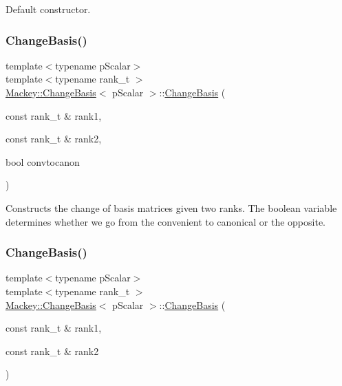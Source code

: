 Default constructor. 

\mbox{\label{classMackey_1_1ChangeBasis_a39b9a8d75509c70e728342172a321924}} 
\subsubsection{\texorpdfstring{Change\+Basis()}{ChangeBasis()}\hspace{0.1cm}{\footnotesize\ttfamily [2/3]}}
{\footnotesize\ttfamily template$<$typename p\+Scalar$>$ \\
template$<$typename rank\+\_\+t $>$ \\
\hyperlink{classMackey_1_1ChangeBasis}{Mackey\+::\+Change\+Basis}$<$ p\+Scalar $>$\+::\hyperlink{classMackey_1_1ChangeBasis}{Change\+Basis} (\begin{DoxyParamCaption}\item[{const rank\+\_\+t \&}]{rank1,  }\item[{const rank\+\_\+t \&}]{rank2,  }\item[{bool}]{convtocanon }\end{DoxyParamCaption})\hspace{0.3cm}{\ttfamily [inline]}}



Constructs the change of basis matrices given two ranks. The boolean variable determines whether we go from the convenient to canonical or the opposite. 

\mbox{\label{classMackey_1_1ChangeBasis_a8cc49fe5537e7038ff7d142ba76e7c7b}} 
\subsubsection{\texorpdfstring{Change\+Basis()}{ChangeBasis()}\hspace{0.1cm}{\footnotesize\ttfamily [3/3]}}
{\footnotesize\ttfamily template$<$typename p\+Scalar$>$ \\
template$<$typename rank\+\_\+t $>$ \\
\hyperlink{classMackey_1_1ChangeBasis}{Mackey\+::\+Change\+Basis}$<$ p\+Scalar $>$\+::\hyperlink{classMackey_1_1ChangeBasis}{Change\+Basis} (\begin{DoxyParamCaption}\item[{const rank\+\_\+t \&}]{rank1,  }\item[{const rank\+\_\+t \&}]{rank2 }\end{DoxyParamCaption})\hspace{0.3cm}{\ttfamily [inline]}}



